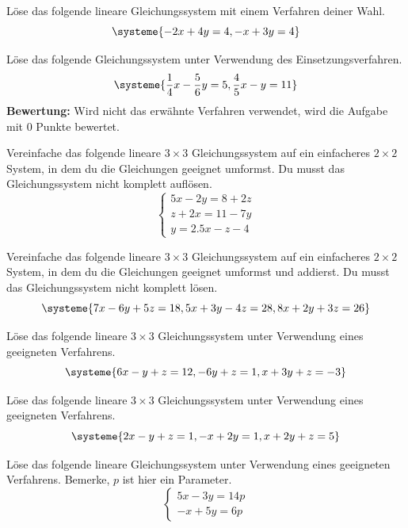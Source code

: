 \documentclass[11pt]{exam}
\begin{document}
\begin{questions}


\question[4] %
Löse das folgende lineare Gleichungssystem mit einem Verfahren deiner Wahl.
\[\systeme{-2x+4y=4,-x+3y=4}\]


\question[4] %
Löse das folgende Gleichungssystem unter Verwendung des Einsetzungsverfahren.
\[\systeme{\frac{1}{4}x-\frac{5}{6}y=5,\frac{4}{5}x-y=11}\]
{\small\textbf{Bewertung:} Wird nicht das erwähnte Verfahren verwendet, wird die Aufgabe mit 0 Punkte bewertet.}

\question[5] %
Vereinfache das folgende lineare $3\times3$ Gleichungssystem auf ein einfacheres $2\times2$ System, in dem du die Gleichungen geeignet umformst. Du musst das Gleichungssystem nicht komplett auflösen.
\[\left\{\begin{matrix}5x-2y=8+2z\\z+2x=11-7y\\y=2.5x-z-4\end{matrix}\right.\]


\question[5] %
Vereinfache das folgende lineare $3\times3$ Gleichungssystem auf ein einfacheres $2\times2$ System, in dem du die Gleichungen geeignet umformst und addierst. Du musst das Gleichungssystem nicht komplett lösen.
\[\systeme{7x-6y+5z=18,5x+3y-4z=28,8x+2y+3z=26}\]


\question[4]
Löse das folgende lineare $3\times3$ Gleichungssystem unter Verwendung eines geeigneten Verfahrens. \[\systeme{6x-y+z=12,-6y+z=1,x+3y+z=-3}\]


\question[4]
Löse das folgende lineare $3\times3$ Gleichungssystem unter Verwendung eines geeigneten Verfahrens. \[\systeme{2x-y+z=1,-x+2y=1,x+2y+z=5}\]


\question[4] %
Löse das folgende lineare Gleichungssystem unter Verwendung eines geeigneten Verfahrens. Bemerke, $p$ ist hier ein Parameter. \[\left\{\begin{matrix}5x-3y=14p\\-x+5y=6p\end{matrix}\right.\]



\end{questions}
\end{document}
